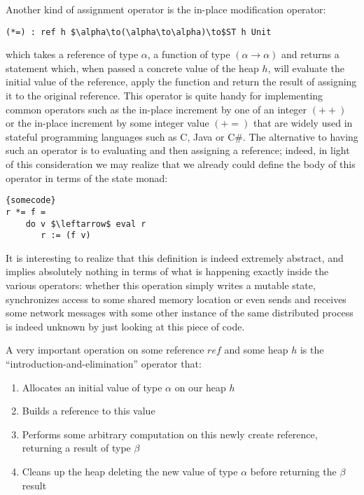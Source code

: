\documentclass[a4paper]{article}
\begin{document}
 Another kind of assignment operator is the in-place modification operator:

\begin{lstlisting}
(*=) : ref h $\alpha\to(\alpha\to\alpha)\to$ST h Unit
\end{lstlisting}

which takes a reference of type $\alpha $, a function of type $(\alpha \to \alpha )$ and returns a statement which, when passed a concrete value of the heap $h$, will evaluate the initial value of the reference, apply the function and return the result of assigning it to the original reference. This operator is quite handy for implementing common operators such as the in-place increment by one of an integer $(++)$ or the in-place increment by some integer value $(+=)$ that are widely used in stateful programming languages such as C, Java or C\#. The alternative to having such an operator is to evaluating and then assigning a reference; indeed, in light of this consideration we may realize that we already could define the body of this operator in terms of the state monad:


\begin{lstlisting}[frame=tb,mathescape]{somecode}
r *= f = 
	do v $\leftarrow$ eval r
	   r := (f v)
\end{lstlisting}

It is interesting to realize that this definition is indeed extremely abstract, and implies absolutely nothing in terms of what is happening exactly inside the various operators: whether this operation simply writes a mutable state, synchronizes access to some shared memory location or even sends and receives some network messages with some other instance of the same distributed process is indeed unknown by just looking at this piece of code.

 A very important operation on some reference $ref$ and some heap $h$ is the ``introduction-and-elimination'' operator that:

\begin{enumerate}
\item  Allocates an initial value of type $\alpha $ on our heap $h$

\item  Builds a reference to this value

\item  Performs some arbitrary computation on this newly create reference, returning a result of type $\beta $

\item  Cleans up the heap deleting the new value of type $\alpha $ before returning the $\beta \ $result 
\end{enumerate}
\end{document}
